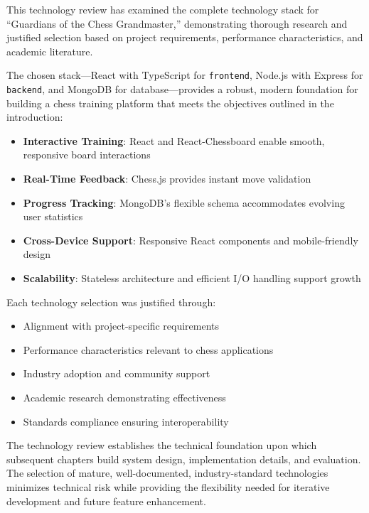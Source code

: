 This technology review has examined the complete technology stack for ``Guardians of the Chess Grandmaster,'' demonstrating thorough research and justified selection based on project requirements, performance characteristics, and academic literature.

The chosen stack---React with TypeScript for \texttt{frontend}, Node.js with Express for \texttt{backend}, and MongoDB for database---provides a robust, modern foundation for building a chess training platform that meets the objectives outlined in the introduction:

\begin{itemize}
    \item \textbf{Interactive Training}: React and React-Chessboard enable smooth, responsive board interactions
    \item \textbf{Real-Time Feedback}: Chess.js provides instant move validation
    \item \textbf{Progress Tracking}: MongoDB's flexible schema accommodates evolving user statistics
    \item \textbf{Cross-Device Support}: Responsive React components and mobile-friendly design
    \item \textbf{Scalability}: Stateless architecture and efficient I/O handling support growth
\end{itemize}

Each technology selection was justified through:
\begin{itemize}
    \item Alignment with project-specific requirements
    \item Performance characteristics relevant to chess applications
    \item Industry adoption and community support
    \item Academic research demonstrating effectiveness
    \item Standards compliance ensuring interoperability
\end{itemize}

The technology review establishes the technical foundation upon which subsequent chapters build system design, implementation details, and evaluation. The selection of mature, well-documented, industry-standard technologies minimizes technical risk while providing the flexibility needed for iterative development and future feature enhancement.